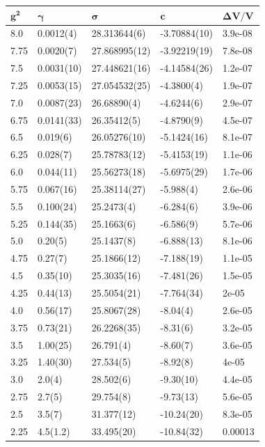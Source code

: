 \begin{table}[!hb]
\centering
\begin{tabular}{lllll}
    $\mathbf{g^2}$ & $\mathbf{\gamma}$ & $\mathbf{\sigma}$ & $\mathbf{c}$ & $\mathbf{\Delta V/V}$ \\ \hline
   8.0 & 0.0012(4) & 28.313644(6) & -3.70884(10) & 3.9e-08 \\
   7.75 & 0.0020(7) & 27.868995(12) & -3.92219(19) & 7.8e-08 \\
   7.5 & 0.0031(10) & 27.448621(16) & -4.14584(26) & 1.2e-07 \\
   7.25 & 0.0053(15) & 27.054532(25) & -4.3800(4) & 1.9e-07 \\
   7.0 & 0.0087(23) & 26.68890(4) & -4.6244(6) & 2.9e-07 \\
   6.75 & 0.0141(33) & 26.35412(5) & -4.8790(9) & 4.5e-07 \\
   6.5 & 0.019(6) & 26.05276(10) & -5.1424(16) & 8.1e-07 \\
   6.25 & 0.028(7) & 25.78783(12) & -5.4153(19) & 1.1e-06 \\
   6.0 & 0.044(11) & 25.56273(18) & -5.6975(29) & 1.7e-06 \\
   5.75 & 0.067(16) & 25.38114(27) & -5.988(4) & 2.6e-06 \\
   5.5 & 0.100(24) & 25.2473(4) & -6.284(6) & 3.9e-06 \\
   5.25 & 0.144(35) & 25.1663(6) & -6.586(9) & 5.7e-06 \\
   5.0 & 0.20(5) & 25.1437(8) & -6.888(13) & 8.1e-06 \\
   4.75 & 0.27(7) & 25.1866(12) & -7.188(19) & 1.1e-05 \\
   4.5 & 0.35(10) & 25.3035(16) & -7.481(26) & 1.5e-05 \\
   4.25 & 0.44(13) & 25.5054(21) & -7.764(34) & 2e-05 \\
   4.0 & 0.56(17) & 25.8067(28) & -8.04(4) & 2.6e-05 \\
   3.75 & 0.73(21) & 26.2268(35) & -8.31(6) & 3.2e-05 \\
   3.5 & 1.00(25) & 26.791(4) & -8.60(7) & 3.6e-05 \\
   3.25 & 1.40(30) & 27.534(5) & -8.92(8) & 4e-05 \\
   3.0 & 2.0(4) & 28.502(6) & -9.30(10) & 4.4e-05 \\
   2.75 & 2.7(5) & 29.754(8) & -9.73(13) & 5.6e-05 \\
   2.5 & 3.5(7) & 31.377(12) & -10.24(20) & 8.3e-05 \\
   2.25 & 4.5(1.2) & 33.495(20) & -10.84(32) & 0.00013 \\

\end{tabular}
\end{table}
